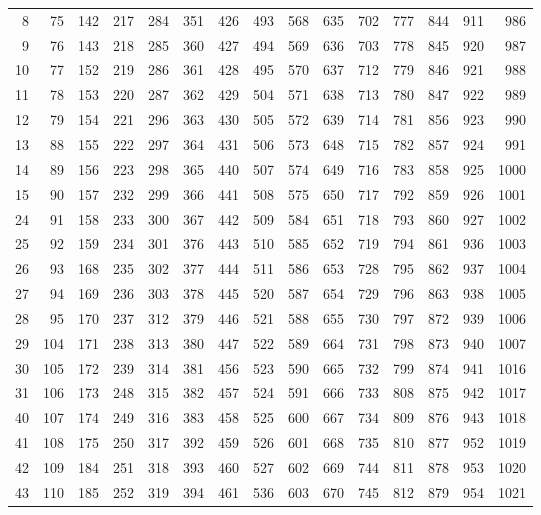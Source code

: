 \documentclass{assignment}
\begin{document}
\begin{tabular}{r r r r r r r r r r r r r r r}
8 & 75 & 142 & 217 & 284 & 351 & 426 & 493 & 568 & 635 & 702 & 777 & 844 & 911 & 986 \\
9 & 76 & 143 & 218 & 285 & 360 & 427 & 494 & 569 & 636 & 703 & 778 & 845 & 920 & 987 \\
10 & 77 & 152 & 219 & 286 & 361 & 428 & 495 & 570 & 637 & 712 & 779 & 846 & 921 & 988 \\
11 & 78 & 153 & 220 & 287 & 362 & 429 & 504 & 571 & 638 & 713 & 780 & 847 & 922 & 989 \\
12 & 79 & 154 & 221 & 296 & 363 & 430 & 505 & 572 & 639 & 714 & 781 & 856 & 923 & 990 \\
13 & 88 & 155 & 222 & 297 & 364 & 431 & 506 & 573 & 648 & 715 & 782 & 857 & 924 & 991 \\
14 & 89 & 156 & 223 & 298 & 365 & 440 & 507 & 574 & 649 & 716 & 783 & 858 & 925 & 1000 \\
15 & 90 & 157 & 232 & 299 & 366 & 441 & 508 & 575 & 650 & 717 & 792 & 859 & 926 & 1001 \\
24 & 91 & 158 & 233 & 300 & 367 & 442 & 509 & 584 & 651 & 718 & 793 & 860 & 927 & 1002 \\
25 & 92 & 159 & 234 & 301 & 376 & 443 & 510 & 585 & 652 & 719 & 794 & 861 & 936 & 1003 \\
26 & 93 & 168 & 235 & 302 & 377 & 444 & 511 & 586 & 653 & 728 & 795 & 862 & 937 & 1004 \\
27 & 94 & 169 & 236 & 303 & 378 & 445 & 520 & 587 & 654 & 729 & 796 & 863 & 938 & 1005 \\
28 & 95 & 170 & 237 & 312 & 379 & 446 & 521 & 588 & 655 & 730 & 797 & 872 & 939 & 1006 \\
29 & 104 & 171 & 238 & 313 & 380 & 447 & 522 & 589 & 664 & 731 & 798 & 873 & 940 & 1007 \\
30 & 105 & 172 & 239 & 314 & 381 & 456 & 523 & 590 & 665 & 732 & 799 & 874 & 941 & 1016 \\
31 & 106 & 173 & 248 & 315 & 382 & 457 & 524 & 591 & 666 & 733 & 808 & 875 & 942 & 1017 \\
40 & 107 & 174 & 249 & 316 & 383 & 458 & 525 & 600 & 667 & 734 & 809 & 876 & 943 & 1018 \\
41 & 108 & 175 & 250 & 317 & 392 & 459 & 526 & 601 & 668 & 735 & 810 & 877 & 952 & 1019 \\
42 & 109 & 184 & 251 & 318 & 393 & 460 & 527 & 602 & 669 & 744 & 811 & 878 & 953 & 1020 \\
43 & 110 & 185 & 252 & 319 & 394 & 461 & 536 & 603 & 670 & 745 & 812 & 879 & 954 & 1021 \\

\end{tabular}
\end{document}
